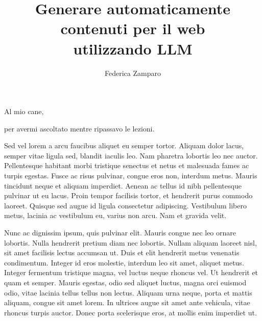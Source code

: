 \documentclass[target=mst,aauheader=,style=]{thud}
\title{Generare automaticamente \\ contenuti per il web \\ utilizzando LLM}
\author{Federica Zamparo}
\begin{document}
\maketitle

\begin{dedication}
	Al mio cane,\par per avermi ascoltato mentre ripassavo le lezioni.
\end{dedication}

\acknowledgements
Sed vel lorem a arcu faucibus aliquet eu semper tortor. Aliquam dolor lacus, semper vitae ligula sed, blandit iaculis leo. Nam pharetra lobortis leo nec auctor. Pellentesque habitant morbi tristique senectus et netus et malesuada fames ac turpis egestas. Fusce ac risus pulvinar, congue eros non, interdum metus. Mauris tincidunt neque et aliquam imperdiet. Aenean ac tellus id nibh pellentesque pulvinar ut eu lacus. Proin tempor facilisis tortor, et hendrerit purus commodo laoreet. Quisque sed augue id ligula consectetur adipiscing. Vestibulum libero metus, lacinia ac vestibulum eu, varius non arcu. Nam et gravida velit.

\abstract
Nunc ac dignissim ipsum, quis pulvinar elit. Mauris congue nec leo ornare lobortis. Nulla hendrerit pretium diam nec lobortis. Nullam aliquam laoreet nisl, sit amet facilisis lectus accumsan ut. Duis et elit hendrerit metus venenatis condimentum. Integer id eros molestie, interdum leo sit amet, aliquet metus. Integer fermentum tristique magna, vel luctus neque rhoncus vel. Ut hendrerit et quam et semper. Mauris egestas, odio sed aliquet luctus, magna orci euismod odio, vitae lacinia tellus tellus non lectus. Aliquam urna neque, porta et mattis aliquam, congue sit amet lorem. In ultrices augue sit amet ante vehicula, vitae rhoncus turpis auctor. Donec porta scelerisque eros, at mollis enim imperdiet ut. 

\tableofcontents



\mainmatter

\end{document}
